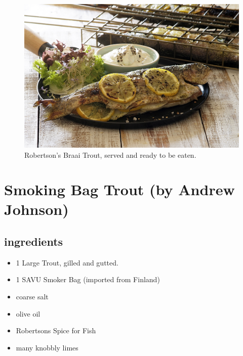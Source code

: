 \begin{figure}[H]
\centering
  \includegraphics[scale=0.2]{recipes/braaiTroutServed.jpg}
   \caption{Robertson's Braai Trout, served and ready to be eaten.}
  \label{fig:braaiTroutServed}
\end{figure}

\section{Smoking Bag Trout (by Andrew Johnson)}

\subsection*{ingredients}
\begin{itemize}
\item 1 Large Trout, gilled and gutted.
\item 1 SAVU Smoker Bag (imported from Finland)
\item coarse salt
\item olive oil
\item Robertsons Spice for Fish
\item many knobbly limes 
\end{itemize}

